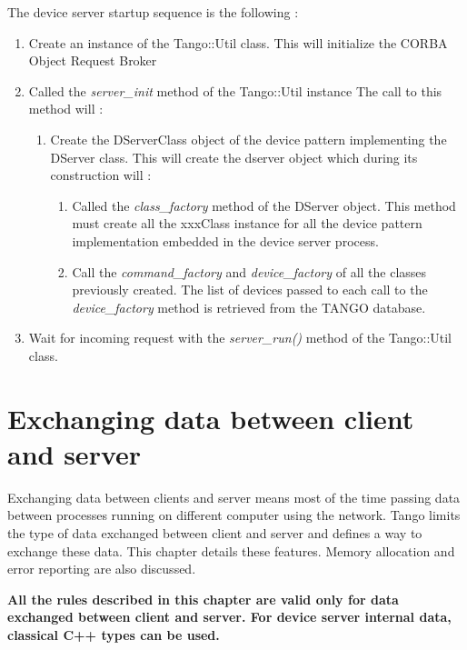 The device server startup sequence is the following :
\begin{enumerate}
\item Create an instance of the Tango::Util class. This will initialize
the CORBA Object Request Broker
\item Called the \emph{server\_init} method of the Tango::Util
instance The call to this method will :

\begin{enumerate}
\item Create the DServerClass object of the device pattern implementing
the DServer class. This will create the dserver object
which during its construction will :

\begin{enumerate}
\item Called the \emph{class\_factory} method of the
DServer object. This method must create all the xxxClass instance
for all the device pattern implementation embedded in the device server
process.
\item Call the \emph{command\_factory} and \emph{device\_factory}
of all the classes previously created. The list of devices passed
to each call to the \emph{device\_factory} method is retrieved from
the TANGO database.
\end{enumerate}
\end{enumerate}
\item Wait for incoming request with the \emph{server\_run()}
method of the Tango::Util class.
\end{enumerate}

\section{Exchanging data between client and server\label{Data exchange}}

Exchanging data between clients and server means most of the time
passing data between processes running on different computer using
the network. Tango limits the type of data exchanged between client
and server and defines a way to exchange these data. This chapter
details these features. Memory allocation and error reporting are
also discussed.

\textbf{All the rules described in this chapter are valid only for
data exchanged between client and server. For device server internal
data, classical C++ types can be used.}


